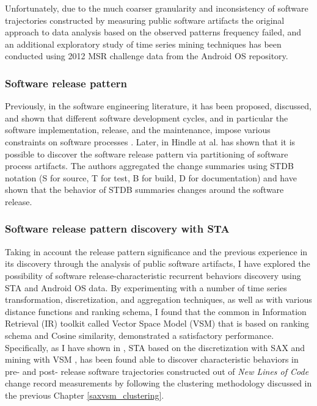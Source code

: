Unfortunately, due to the much coarser granularity and inconsistency of software trajectories constructed by measuring
public software artifacts the original approach to data analysis based on the observed patterns frequency failed, 
and an additional exploratory study of time series mining techniques has been conducted using 2012 MSR challenge data
\cite{MSRChallenge2012} from the Android OS repository.

\subsubsection{Software release pattern}
Previously, in the software engineering literature, it has been proposed, discussed, and shown that different software 
development cycles, and in particular the software implementation, release, and the maintenance, impose various constraints 
on software processes \cite{citeulike:1802027} \cite{citeulike:13374124} \cite{citeulike:13374128} \cite{citeulike:6086365}.
Later, in \cite{citeulike:10377366} Hindle at al. has shown that it is possible to discover the software release pattern
via partitioning of software process artifacts. The authors aggregated the change summaries using STDB notation 
(S for source, T for test, B for build, D for documentation) and have shown that the behavior of STDB summaries changes
around the software release.

\subsubsection{Software release pattern discovery with STA}
Taking in account the release pattern significance and the previous experience in its discovery through the analysis of 
public software artifacts, I have explored the possibility of software release-characteristic recurrent behaviors discovery using 
STA and Android OS data.
By experimenting with a number of time series transformation, discretization, and aggregation techniques, as well as with various 
distance functions and ranking schema, I found that the common in Information Retrieval (IR) toolkit called Vector Space Model 
(VSM) \cite{citeulike:300428} that is based on \tfidf ranking schema and Cosine similarity, demonstrated a satisfactory performance. 
Specifically, as I have shown in \cite{csdl2-11-10}, STA based on the discretization with SAX \cite{sax} and mining with VSM 
\cite{citeulike:300428}, has been found able to discover characteristic behaviors in pre- and post- release software trajectories 
constructed out of \textit{New Lines of Code} change record measurements by following the clustering methodology discussed
in the previous Chapter \ref{saxvsm_clustering}. 

